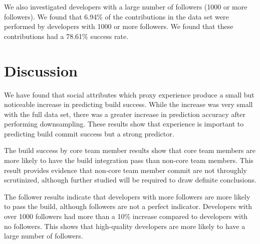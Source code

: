 \documentclass[10pt, conference]{IEEEtran}
\begin{document}
We also investigated developers with a large number of followers (1000 or more
followers).  We found that 6.94\% of the contributions in the data set were
performed by developers with 1000 or more followers.  We found that these
contributions had a 78.61\% success rate.



\section{Discussion}
We have found that social attributes which proxy experience produce a small but
noticeable increase in predicting build success.  While the increase was very
small with the full data set, there was a greater increase in prediction
accuracy after performing downsampling.  These results show that experience is
important to predicting build commit success but a strong predictor.

The build success by core team member results show that core team members are
more likely to have the build integration pass than non-core team members.  This
result provides evidence that non-core team member commit are not throughly
scrutinized, although further studied will be required to draw definite
conclusions.

The follower results indicate that developers with more followers are more
likely to pass the build, although followers are not a perfect indicator.
Developers with over 1000 followers had more than a 10\% increase compared to
developers with no followers.  This shows that high-quality developers are more
likely to have a large number of followers.

%
%
\end{document}
